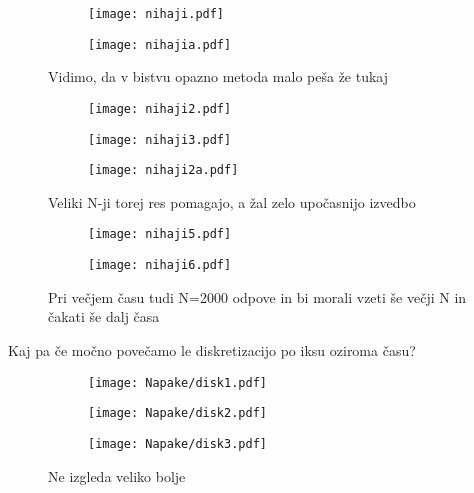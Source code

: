 \documentclass{article}
\begin{document}
\begin{figure}[H]
\begin{subfigure}{.5\textwidth}
\texttt{[image: nihaji.pdf]}
\end{subfigure}
\begin{subfigure}{.5\textwidth}
\texttt{[image: nihajia.pdf]}
\end{subfigure}
\caption*{Vidimo, da v bistvu opazno metoda malo peša že tukaj}
\end{figure}

\begin{figure}[H]
\begin{subfigure}{.3\textwidth}
\texttt{[image: nihaji2.pdf]}
\end{subfigure}
\begin{subfigure}{.3\textwidth}
\texttt{[image: nihaji3.pdf]}
\end{subfigure}
\begin{subfigure}{.3\textwidth}
\texttt{[image: nihaji2a.pdf]}
\end{subfigure}
\caption*{Veliki N-ji torej res pomagajo, a žal zelo upočasnijo izvedbo}
\end{figure}


\begin{figure}[H]
\begin{subfigure}{.5\textwidth}
\texttt{[image: nihaji5.pdf]}
\end{subfigure}
\begin{subfigure}{.5\textwidth}
\texttt{[image: nihaji6.pdf]}
\end{subfigure}
\caption*{Pri večjem času tudi N=2000 odpove in bi morali vzeti še večji N in čakati še dalj časa}
\end{figure}


Kaj pa če močno povečamo le diskretizacijo po iksu oziroma času?

\begin{figure}[H]
\begin{subfigure}{.3\textwidth}
\texttt{[image: Napake/disk1.pdf]}
\end{subfigure}
\begin{subfigure}{.3\textwidth}
\texttt{[image: Napake/disk2.pdf]}
\end{subfigure}
\begin{subfigure}{.3\textwidth}
\texttt{[image: Napake/disk3.pdf]}
\end{subfigure}
\caption*{Ne izgleda veliko bolje}
\end{figure}
\end{document}
